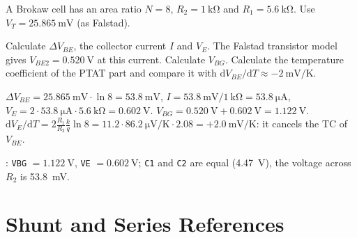 A Brokaw cell has an area ratio $N = 8$, $R_2 = \SI{1}{\kilo\ohm}$ and
$R_1 = \SI{5.6}{\kilo\ohm}$. Use $V_T = \SI{25.865}{\milli\volt}$ (as Falstad).
\begin{talist}
\ta Calculate $\Delta V_{BE}$, the collector current $I$ and $V_E$.
\ta The Falstad transistor model gives $V_{BE2} = \SI{0.520}{\volt}$ at this current. Calculate $V_{BG}$.
\ta Calculate the temperature coefficient of the PTAT part and compare it with $\mathrm{d}V_{BE}/\mathrm{d}T \approx -\SI{2}{\milli\volt/\kelvin}$.
\end{talist}

\begin{solution}
\begin{talist}
\ta $\Delta V_{BE} = \SI{25.865}{\milli\volt}\cdot\ln 8 = \SI{53.8}{\milli\volt}$,
	$I = \SI{53.8}{\milli\volt}/\SI{1}{\kilo\ohm} = \SI{53.8}{\micro\ampere}$,
	$V_E = 2\cdot\SI{53.8}{\micro\ampere}\cdot\SI{5.6}{\kilo\ohm} = \SI{0.602}{\volt}$.
\ta $V_{BG} = \SI{0.520}{\volt}+\SI{0.602}{\volt} = \SI{1.122}{\volt}$.
\ta $\mathrm{d}V_E/\mathrm{d}T = 2\frac{R_1}{R_2}\frac{k}{q}\ln 8 = 11.2\cdot\SI{86.2}{\micro\volt/\kelvin}\cdot 2.08 = +\SI{2.0}{\milli\volt/\kelvin}$:
	it cancels the TC of $V_{BE}$.
\item[] : \texttt{VBG} $=\SI{1.122}{\volt}$, \texttt{VE} $=\SI{0.602}{\volt}$;
	\texttt{C1} and \texttt{C2} are equal (\SI{4.47}{\volt}), the voltage across $R_2$ is \SI{53.8}{\milli\volt}.
\end{talist}
\end{solution}

\section{Shunt and Series References}

